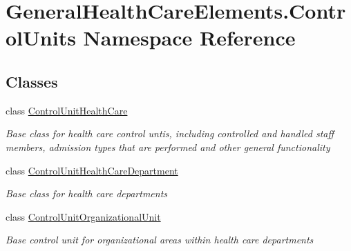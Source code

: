 \hypertarget{namespace_general_health_care_elements_1_1_control_units}{}\section{General\+Health\+Care\+Elements.\+Control\+Units Namespace Reference}
\label{namespace_general_health_care_elements_1_1_control_units}
\subsection*{Classes}
\begin{DoxyCompactItemize}
\item 
class \hyperlink{class_general_health_care_elements_1_1_control_units_1_1_control_unit_health_care}{Control\+Unit\+Health\+Care}
\begin{DoxyCompactList}\small\item\em Base class for health care control untis, including controlled and handled staff members, admission types that are performed and other general functionality \end{DoxyCompactList}\item 
class \hyperlink{class_general_health_care_elements_1_1_control_units_1_1_control_unit_health_care_department}{Control\+Unit\+Health\+Care\+Department}
\begin{DoxyCompactList}\small\item\em Base class for health care departments \end{DoxyCompactList}\item 
class \hyperlink{class_general_health_care_elements_1_1_control_units_1_1_control_unit_organizational_unit}{Control\+Unit\+Organizational\+Unit}
\begin{DoxyCompactList}\small\item\em Base control unit for organizational areas within health care departments \end{DoxyCompactList}\end{DoxyCompactItemize}
